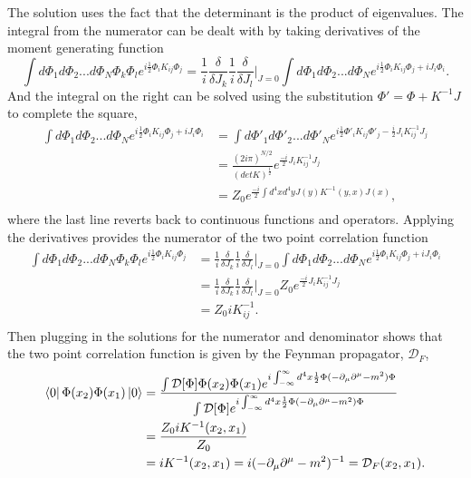 The solution uses the fact that the determinant is the product of eigenvalues. The integral from the numerator can be dealt with by taking derivatives of the moment generating function 
\begin{equation}
\int d\Phi_1 d\Phi_2 ... d\Phi_N \Phi_k\Phi_l e^{i\frac{1}{2}\Phi_{i} K_{ij} \Phi_{j}} 
= \frac{1}{i}\frac{\delta}{\delta J_k}\frac{1}{i}\frac{\delta}{\delta J_l}\Big|_{J=0} 
\int d\Phi_1 d\Phi_2 ... d\Phi_N e^{i\frac{1}{2}\Phi_{i} K_{ij} \Phi_{j} + iJ_i\Phi_i}. 
\end{equation}
And the integral on the right can be solved using the substitution $\Phi' = \Phi + K^{-1}J$ to complete the square, 
\begin{equation}
\begin{split}
\int d\Phi_1 d\Phi_2 ... d\Phi_N e^{i\frac{1}{2}\Phi_{i} K_{ij} \Phi_{j} + iJ_i\Phi_i} 
&= \int d\Phi'_1 d\Phi'_2 ... d\Phi'_N e^{i\frac{1}{2}\Phi'_{i} K_{ij} \Phi'_{j} - \frac{i}{2}J_i K^{-1}_{ij} J_j}\\ 
&= \frac{\left( 2i\pi \right)^{N/2}}{ \left( detK \right)^\frac{1}{2}}e^{\frac{-i}{2}J_i K^{-1}_{ij} J_j}\\
&= Z_0e^{\frac{-i}{2}\int d^4x d^4y J(y) K^{-1}(y,x) J(x)},\\
\end{split}
\end{equation}
where the last line reverts back to continuous functions and operators. Applying the derivatives provides the numerator of the two point correlation function 
\begin{equation}
\begin{split}
\int d\Phi_1 d\Phi_2 ... d\Phi_N \Phi_k\Phi_l e^{i\frac{1}{2}\Phi_{i} K_{ij} \Phi_{j}} 
& = \frac{1}{i}\frac{\delta}{\delta J_k}\frac{1}{i}\frac{\delta}{\delta J_l}\Big|_{J=0} \int d\Phi_1 d\Phi_2 ... d\Phi_N e^{i\frac{1}{2}\Phi_{i} K_{ij} \Phi_{j} + iJ_i\Phi_i} \\
& = \frac{1}{i}\frac{\delta}{\delta J_k}\frac{1}{i}\frac{\delta}{\delta J_l}\Big|_{J=0} Z_0e^{\frac{-i}{2}J_i K^{-1}_{ij} J_j} \\ 
& = Z_0 iK^{-1}_{ij}. \\
\end{split}
\end{equation}
Then plugging in the solutions for the numerator and denominator shows that the two point correlation function is given by the Feynman propagator, $\mathcal{D}_F$, 
\begin{equation}
\begin{split}
\bra{0}\Phi(x_2)\Phi(x_1)\ket{0} &= 
\frac{\int \mathcal{D}[\Phi]\Phi(x_2)\Phi(x_1)e^{i\int_{-\infty}^{\infty} d^4x \frac{1}{2}\Phi (-\partial_\mu\partial^\mu - m^2)\Phi}}
{\int \mathcal{D}[\Phi]e^{i\int_{-\infty}^{\infty} d^4x \frac{1}{2}\Phi (-\partial_\mu\partial^\mu - m^2)\Phi}} \\
&= \frac{Z_0 iK^{-1}(x_2,x_1)}{Z_0} \\
&= iK^{-1}(x_2,x_1) = i(-\partial_\mu\partial^\mu - m^2)^{-1} = \mathcal{D}_F(x_2,x_1).\\ 
\end{split}
\end{equation}
